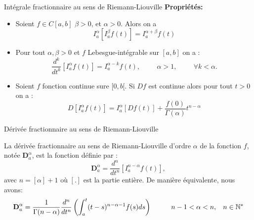 \documentclass{sintefbeamer}
\begin{document}
\begin{frame}{Intégrale fractionnaire au sens de Riemann-Liouville}
    \textbf{Propriétés:}
    \begin{itemize}
        \item Soient $f \in C[a,b]$ $\beta >0$, et $\alpha >0$. Alors on a 
    \begin{equation}
        I_{a}^{\alpha}[I_{a}^{\beta}f(t)] = I_{a}^{\alpha + \beta} f(t)
    \end{equation}
    \item Pour tout $\alpha, \beta >0$ et $f$ Lebesgue-intégrable sur $[a,b]$ on a :
    \begin{equation}
        \frac{d^k}{dt^k}[I_a^{\alpha} f(t)] = I_{a}^{\alpha - k} f(t) , \hspace{1cm} \alpha >1, \hspace{1cm}\forall k <\alpha.
    \end{equation}
    \item Soient $f$ fonction continue sure $[0,b[$. Si $Df$ est continue alors pour tout $t>0$ on a :
    \begin{equation}
        D[I_{a}^{\alpha}f(t)] = I_{a}^{\alpha}[Df(t)]+\frac{f(0)}{\Gamma(\alpha)}t^{n-\alpha}
    \end{equation}
    \end{itemize}
\end{frame}


\begin{frame}{Dérivée fractionnaire au sens de Riemann-Liouville}
    \begin{definition}
    La dérivée fractionnaire au sens de Riemann-Liouville d'ordre $\alpha$ de la fonction $f$, notée $ \textbf{D}_a^{\alpha}$, est la fonction définie par :\\
    \begin{equation} \label{eq:D_R-L}
        \textbf{D}_a^{\alpha} = \frac{d^n}{dt^n} \left[I_a^{n-\alpha} f(t) \right],
    \end{equation}
    avec $n =[\alpha] + 1$ où $[.]$ est la partie entière. 
    De manière équivalente, nous avons:
\begin{equation}
    \textbf{D}_a^{\alpha} =
        \frac{1}{\Gamma(n-\alpha)} \frac{d^n}{dt^n}\left( \int_a^t(t-s)^{n-\alpha-1}f(s)ds\right) \hspace{1cm} n-1<\alpha<n, \hspace{0.3cm} n\in\mathbb{N^*}
\end{equation}
\end{definition}
\end{frame}
\end{document}
